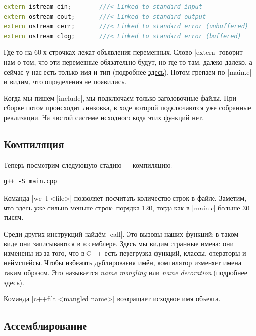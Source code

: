 \documentclass[11pt]{article}
\begin{document}
\begin{lstlisting}[language=C++]
extern istream cin;        ///< Linked to standard input
extern ostream cout;       ///< Linked to standard output
extern ostream cerr;       ///< Linked to standard error (unbuffered)
extern ostream clog;       ///< Linked to standard error (buffered)
\end{lstlisting}

Где-то на 60-х строчках лежат объявления переменных. Слово \nolint|extern| говорит нам о том, что эти переменные обязательно будут, но где-то там, далеко-далеко, а сейчас у нас есть только имя и тип (подробнее \href{https://en.cppreference.com/cpp/keyword/extern}{здесь}). Потом грепаем по
\nolint|main.e| и видим, что определения не появились.

Когда мы пишем \nolint|include|, мы подключаем только заголовочные файлы.
При сборке потом происходит линковка, в ходе которой подключаются уже собранные
реализации. На чистой системе исходного кода этих функций нет.

\subsection{Компиляция}

Теперь посмотрим следующую стадию --- компиляцию:

\begin{lstlisting}
g++ -S main.cpp
\end{lstlisting}

Команда \nolint|wc -l <file>| позволяет посчитать количество строк в файле.
Заметим, что здесь уже сильно меньше строк: порядка 120, тогда как в
\nolint|main.e| больше 30 тысяч.

Среди других инструкций найдём \nolint|call|. Это вызовы наших функций;
в таком виде они записываются в ассемблере. Здесь мы видим странные имена:
они изменены из-за того, что в C++ есть перегрузка функций, классы, операторы
и неймспейсы. Чтобы избежать дублирования имён, компилятор изменяет имена
таким образом. Это называется \textit{name mangling} или \textit{name decoration} (подробнее \href{https://en.wikipedia.org/wiki/Name_mangling}{здесь}).

Команда \nolint|c++filt <mangled name>| возвращает исходное имя объекта.

\subsection{Ассемблирование}
\end{document}
